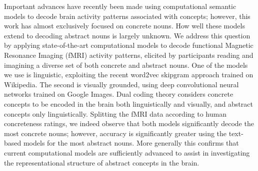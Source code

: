 Important advances have recently been made using computational semantic models to decode brain activity patterns associated with concepts; however, this work has almost exclusively focused on concrete nouns. How well these models extend to decoding abstract nouns is largely unknown. We address this question by applying state-of-the-art computational models to decode functional Magnetic Resonance Imaging (fMRI) activity patterns, elicited by participants reading and imagining a diverse set of both concrete and abstract nouns. One of the models we use is linguistic, exploiting the recent word2vec skipgram approach trained on Wikipedia. The second is visually grounded, using deep convolutional neural networks trained on Google Images. Dual coding theory considers concrete concepts to be encoded in the brain both linguistically and visually, and abstract concepts only linguistically. Splitting the fMRI data according to human concreteness ratings, we indeed observe that both models significantly decode the most concrete nouns; however, accuracy is significantly greater using the text-based models for the most abstract nouns. More generally this confirms that current computational models are sufficiently advanced to assist in investigating the representational structure of abstract concepts in the brain.